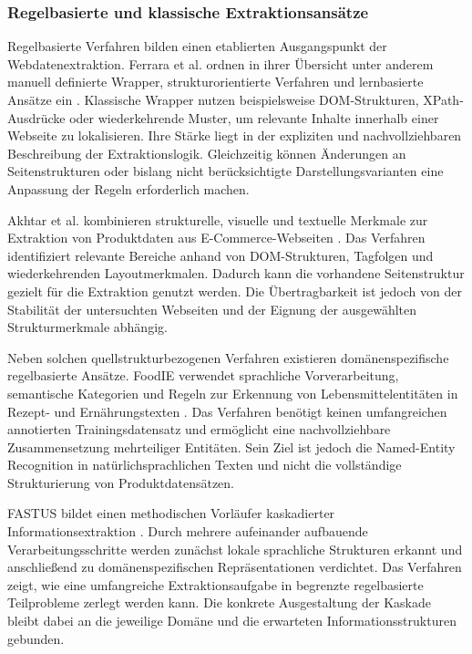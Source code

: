 \subsubsection{Regelbasierte und klassische Extraktionsansätze}

Regelbasierte Verfahren bilden einen etablierten Ausgangspunkt der Webdatenextraktion. Ferrara et al. ordnen in ihrer Übersicht unter anderem manuell definierte 
Wrapper, strukturorientierte Verfahren und lernbasierte Ansätze ein \cite{ferrara2014web}. Klassische Wrapper nutzen beispielsweise DOM-Strukturen, XPath-Ausdrücke 
oder wiederkehrende Muster, um relevante Inhalte innerhalb einer Webseite zu lokalisieren. Ihre Stärke liegt in der expliziten und nachvollziehbaren Beschreibung 
der Extraktionslogik. Gleichzeitig können Änderungen an Seitenstrukturen oder bislang nicht berücksichtigte Darstellungsvarianten eine Anpassung der Regeln erforderlich machen.

Akhtar et al. kombinieren strukturelle, visuelle und textuelle Merkmale zur Extraktion von Produktdaten aus E-Commerce-Webseiten \cite{akhtar2020efficient}. Das 
Verfahren identifiziert relevante Bereiche anhand von DOM-Strukturen, Tagfolgen und wiederkehrenden Layoutmerkmalen. Dadurch kann die vorhandene Seitenstruktur 
gezielt für die Extraktion genutzt werden. Die Übertragbarkeit ist jedoch von der Stabilität der untersuchten Webseiten und der Eignung der ausgewählten 
Strukturmerkmale abhängig.

Neben solchen quellstrukturbezogenen Verfahren existieren domänenspezifische regelbasierte Ansätze. FoodIE verwendet sprachliche Vorverarbeitung, semantische 
Kategorien und Regeln zur Erkennung von Lebensmittelentitäten in Rezept- und Ernährungstexten \cite{popovski2019foodie}. Das Verfahren benötigt keinen 
umfangreichen annotierten Trainingsdatensatz und ermöglicht eine nachvollziehbare Zusammensetzung mehrteiliger Entitäten. Sein Ziel ist jedoch die Named-Entity 
Recognition in natürlichsprachlichen Texten und nicht die vollständige Strukturierung von Produktdatensätzen.

FASTUS bildet einen methodischen Vorläufer kaskadierter Informationsextraktion \cite{hobbs1997fastus}. Durch mehrere aufeinander aufbauende Verarbeitungsschritte 
werden zunächst lokale sprachliche Strukturen erkannt und anschließend zu domänenspezifischen Repräsentationen verdichtet. Das Verfahren zeigt, wie eine umfangreiche 
Extraktionsaufgabe in begrenzte regelbasierte Teilprobleme zerlegt werden kann. Die konkrete Ausgestaltung der Kaskade bleibt dabei an die jeweilige Domäne und 
die erwarteten Informationsstrukturen gebunden.

